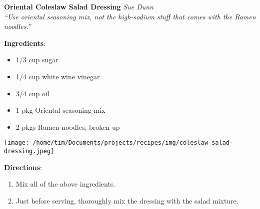 \documentclass[11pt, twoside, openany]{book}
\begin{document}
\noindent\begin{minipage}[t]{\linewidth}%
{\Large\textbf{Oriental Coleslaw Salad Dressing}} \label{oriental-coleslaw-salad-dressing}\hfill\textit{Sue Dunn}\\
\textit{``Use oriental seasoning mix, not the high-sodium stuff that comes with the Ramen noodles.''}\\
\noindent\begin{minipage}[t]{0.78\linewidth}%
\textbf{Ingredients}:\vspace{-3mm}
\begin{multicols}{2}
\begin{itemize}\setlength\itemsep{-1mm}
\item 1/3 cup sugar
\item 1/4 cup white wine vinegar
\item 3/4 cup oil
\item 1 pkg Oriental seasoning mix
\item 2 pkgs Ramen noodles, broken up
\end{itemize}
\end{multicols}
\end{minipage}
\noindent\begin{minipage}[t]{0.18\linewidth}
\centering \strut\vspace*{-\baselineskip}\newline
\texttt{[image: /home/tim/Documents/projects/recipes/img/coleslaw-salad-dressing.jpeg]}\\
\end{minipage}\vspace{3mm}
\textbf{Directions}:
\vspace{-3mm}\begin{enumerate}\setlength\itemsep{-1mm}
\item Mix all of the above ingredients.
\item Just before serving, thoroughly mix the dressing with the salad mixture.
\end{enumerate}
\end{minipage}\vspace{8mm}
\end{document}
